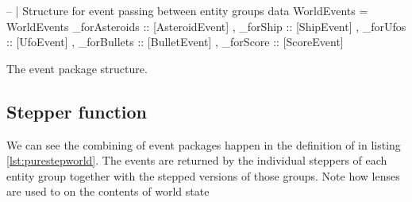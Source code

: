 \documentclass[
  digital, %
  color,   %
  table,   %
  oneside, %
  lof,     %
  lot,     %
]{fithesis3}
\begin{document}
\begin{listing}[H]
\begin{haskell}
-- | Structure for event passing between entity groups
data WorldEvents =
    WorldEvents
    { _forAsteroids :: [AsteroidEvent]
    , _forShip      :: [ShipEvent]
    , _forUfos      :: [UfoEvent]
    , _forBullets   :: [BulletEvent]
    , _forScore     :: [ScoreEvent]
    }
\end{haskell}
\caption{The event package structure.}
\label{lst:events}
\end{listing}


\subsection{Stepper function}
We can see the combining of event packages happen in the definition of 
in listing \ref{lst:purestepworld}. The events are returned by
the individual steppers of each entity group together with the stepped versions
of those groups. Note how lenses are used to  on the contents of world state
\end{document}
